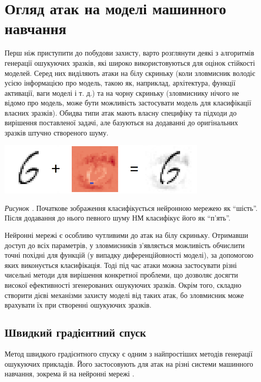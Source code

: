 \documentclass[14pt,a4paper]{extarticle}
\newcounter{e}
\newcounter{pic}
\newcommand{\pic}[1]{\refstepcounter{pic} \vspace{-0.3cm}\textit{Рисунок \arabic{pic}\label{#1}.}}
\numberwithin{equation}{section}
\numberwithin{figure}{section}
\begin{document}
 \newpage
 \thispagestyle{empty}
 \section{Огляд атак на моделі машинного навчання}
 
 Перш ніж приступити до побудови захисту, варто розглянути деякі з алгоритмів генерації ошукуючих зразків, які широко використовуються для оцінок стійкості моделей. Серед них виділяють атаки на білу скриньку (коли зловмисник володіє усією інформацією про модель, такою як, наприклад, архітектура, функції активації, ваги моделі і т. д.) та на чорну скриньку (зловмиснику нічого не відомо про модель, може бути можливість застосувати модель для класифікації власних зразків). Обидва типи атак мають власну специфіку та підходи до вирішення поставленої задачі, але базуються на додаванні до оригінальних зразків штучно створеного шуму.


 \begin{center}
	\includegraphics[width=10cm]{../images/six.png}
 \end{center}
 \begin{center}
	\pic{six}
	Початкове зображення класифікується нейронною мережею як ``шість''. Після додавання до нього певного шуму НМ класифікує його як ``п'ять''.
 \end{center}

 Нейронні мережі є особливо чутливими до атак на білу скриньку. Отримавши доступ до всіх параметрів, у зловмисників з'являється можливість обчислити точні похідні для функцій (у випадку диференційовності моделі), за допомогою яких виконується класифікація. Тоді під час атаки можна застосувати різні чисельні методи для вирішення конкретної проблеми, що дозволяє досягти високої ефективності згенерованих ошукуючих зразків. Окрім того, складно створити дієві механізми захисту моделі від таких атак, бо зловмисник може врахувати їх при створенні ошукуючих зразків. 

 \subsection{Швидкий градієнтний спуск}

 Метод швидкого градієнтного спуску є одним з найпростіших методів генерації ошукуючих прикладів. Його застосовують для атак на різні системи машинного навчання, зокрема й на нейронні мережі \cite{explaining-a-e}.
\end{document}
